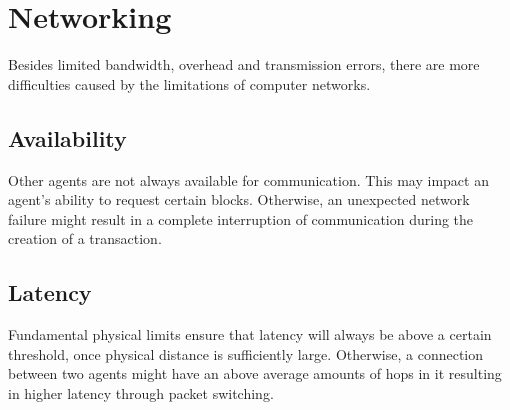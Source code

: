 \section{Networking}
Besides limited bandwidth, overhead and transmission errors, there are more difficulties caused by the limitations of computer networks.

\subsection{Availability}
Other agents are not always available for communication. This may impact an agent's ability to request certain blocks. Otherwise, an unexpected network failure might result in a complete interruption of communication during the creation of a transaction.

\subsection{Latency}
Fundamental physical limits ensure that latency will always be above a certain threshold, once physical distance is sufficiently large. Otherwise, a connection between two agents might have an above average amounts of hops in it resulting in higher latency through packet switching.